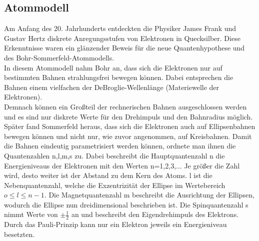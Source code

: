 \documentclass{article}
\begin{document}
{\subsection{Atommodell}
Am Anfang des 20. Jahrhunderts entdeckten die Physiker James Frank und Gustav Hertz diskrete Anregungsstufen  von Elektronen in Quecksilber. Diese Erkenntnisse waren ein glänzender Beweis für die neue Quantenhypothese und des Bohr-Sommerfeld-Atommodells.\\
In diesem Atommodell nahm Bohr an, dass sich die Elektronen nur auf bestimmten Bahnen strahlungsfrei bewegen können. Dabei entsprechen die Bahnen einem vielfachen der DeBroglie-Wellenlänge (Materiewelle der Elektronen).\\
Demnach können ein Großteil der rechnerischen Bahnen ausgeschlossen werden und es sind nur diskrete Werte für den Drehimpuls und den Bahnradius möglich. Später fand Sommerfeld heraus, dass sich die Elektronen auch auf Ellipsenbahnen bewegen können und nicht nur, wie zuvor angenommen, auf Kreisbahnen. Damit die Bahnen eindeutig parametrisiert werden können, ordnete man ihnen die Quantenzahlen n,l,m,s zu. Dabei beschreibt die Hauptquantenzahl n die Energieniveaus der Elektronen mit den Werten n=1,2,3,... Je größer die Zahl wird, desto weiter ist der Abstand zu dem Kern des Atoms. l ist die Nebenquantenzahl, welche die Exzentrizität der Ellipse im Wertebereich \(o\leq l\leq n-1\). Die Magnetquantenzahl m beschreibt die Ausrichtung der Ellipsen, wodurch die Ellipse nun dreidimensional beschrieben ist. Die Spinquantenzahl s nimmt Werte von \(\pm\frac{1}{2}\) an und beschreibt den Eigendrehimpuls des Elektrons. Durch das Pauli-Prinzip kann nur ein Elektron jeweils ein Energieniveau besetzten.

}
\end{document}
